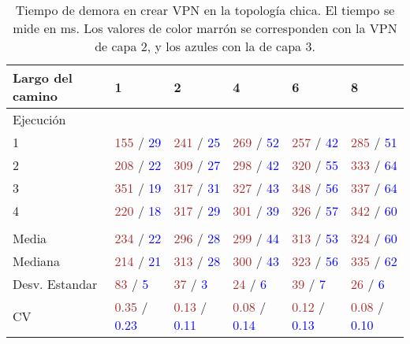 \begin{table}[ht]
	\caption{Tiempo de demora en crear VPN en la topología chica. El tiempo se mide en ms. Los valores de color marrón se corresponden con la VPN de capa 2, y los azules con la de capa 3.}
	\centering 
	\begin{tabular}{p{3.2cm} p{1.8cm} p{1.8cm} p{1.8cm} p{1.8cm} p{1.8cm}}
		\hline
		Largo del camino & 1 & 2 & 4 & 6 & 8 \\ [0.5ex]
		\hline
		Ejecución & & & & & \\
		1 & \textcolor{brown}{155} / \textcolor{blue}{29} & \textcolor{brown}{241} / \textcolor{blue}{25} & \textcolor{brown}{269} / \textcolor{blue}{52} & \textcolor{brown}{257} / \textcolor{blue}{42} & \textcolor{brown}{285} / \textcolor{blue}{51} \\
		2 & \textcolor{brown}{208} / \textcolor{blue}{22} & \textcolor{brown}{309} / \textcolor{blue}{27} & \textcolor{brown}{298} / \textcolor{blue}{42} & \textcolor{brown}{320} / \textcolor{blue}{55} & \textcolor{brown}{333} / \textcolor{blue}{64}  \\
		3 & \textcolor{brown}{351} / \textcolor{blue}{19} & \textcolor{brown}{317} / \textcolor{blue}{31} & \textcolor{brown}{327} / \textcolor{blue}{43} & \textcolor{brown}{348} / \textcolor{blue}{56} & \textcolor{brown}{337} / \textcolor{blue}{64}  \\
		4 & \textcolor{brown}{220} / \textcolor{blue}{18} & \textcolor{brown}{317} / \textcolor{blue}{29} & \textcolor{brown}{301} / \textcolor{blue}{39} & \textcolor{brown}{326} / \textcolor{blue}{57} & \textcolor{brown}{342} / \textcolor{blue}{60}  \\
		& & & & & \\
		Media & \textcolor{brown}{234} / \textcolor{blue}{22} & \textcolor{brown}{296} / \textcolor{blue}{28} & \textcolor{brown}{299} / \textcolor{blue}{44} & \textcolor{brown}{313} / \textcolor{blue}{53} & \textcolor{brown}{324} / \textcolor{blue}{60} \\
		Mediana & \textcolor{brown}{214} / \textcolor{blue}{21} & \textcolor{brown}{313} / \textcolor{blue}{28} & \textcolor{brown}{300} / \textcolor{blue}{43} & \textcolor{brown}{323} / \textcolor{blue}{56} & \textcolor{brown}{335} / \textcolor{blue}{62} \\
		Desv. Estandar & \textcolor{brown}{83} / \textcolor{blue}{5} & \textcolor{brown}{37} / \textcolor{blue}{3} & \textcolor{brown}{24} / \textcolor{blue}{6} & \textcolor{brown}{39} / \textcolor{blue}{7} & \textcolor{brown}{26} / \textcolor{blue}{6} \\
		CV & \textcolor{brown}{0.35} / \textcolor{blue}{0.23} & \textcolor{brown}{0.13} / \textcolor{blue}{0.11} & \textcolor{brown}{0.08} / \textcolor{blue}{0.14} & \textcolor{brown}{0.12} / \textcolor{blue}{0.13} & \textcolor{brown}{0.08} / \textcolor{blue}{0.10} \\ [1ex]
		\hline
	\end{tabular}
	\label{table:tiempo_topo_chica}
\end{table}

